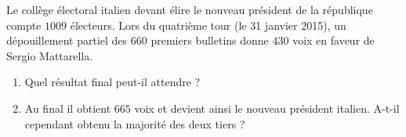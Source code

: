 
\begin{exercice}\label{exo2smath-0127}

    Le collège électoral italien devant élire le nouveau président de la république compte \( 1009\) électeurs. Lors du quatrième tour (le 31 janvier 2015), un dépouillement partiel des \( 660\) premiers bulletins donne \( 430\) voix en faveur de Sergio Mattarella.
    \begin{enumerate}
        \item
            Quel résultat final peut-il attendre ?
        \item
            Au final il obtient \( 665\) voix et devient ainsi le nouveau président italien. A-t-il cependant obtenu la majorité des deux tiers ?
    \end{enumerate}

\end{exercice}
